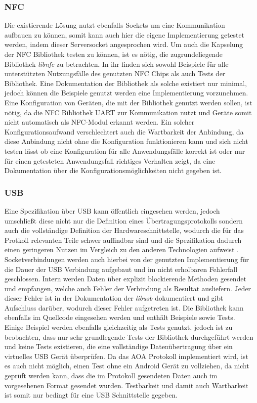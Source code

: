 		\subsubsection{NFC} Die existierende Lösung nutzt ebenfalls Sockets um eine Kommunikation aufbauen zu können, somit kann auch hier die eigene Implementierung getestet werden, indem dieser Serversocket angesprochen wird. Um auch die Kapselung der NFC Bibliothek testen zu können, ist es nötig, die zugrundeliegende Bibliothek {\it libnfc} zu betrachten. In ihr finden sich sowohl Beispiele für alle unterstützten Nutzungsfälle des genutzten NFC Chips als auch Tests der Bibliothek. Eine Dokumentation der Bibliothek als solche existiert nur minimal, jedoch können die Beispiele genutzt werden eine Implementierung vorzunehmen. Eine Konfiguration von Geräten, die mit der Bibliothek genutzt werden sollen, ist nötig, da die NFC Bibliothek UART zur Kommunikation nutzt und Geräte somit nicht automatisch als NFC-Modul erkannt werden. Ein solcher Konfigurationsaufwand verschlechtert auch die Wartbarkeit der Anbindung, da diese Anbindung nicht ohne die Konfiguration funktionieren kann und sich nicht testen lässt ob eine Konfiguration für alle Anwendungsfälle korrekt ist oder nur für einen getesteten Anwendungsfall richtiges Verhalten zeigt, da eine Dokumentation über die Konfigurationsmöglichkeiten nicht gegeben ist. 
		
          \subsubsection{USB} Eine Spezifikation über USB kann öffentlich eingesehen werden, jedoch umschließt diese nicht nur die Definition eines Übertragungsprotokolls sondern auch die \linebreak vollständige Definition der Hardwareschnittstelle, wodurch die für das Protkoll relevanten Teile schwer auffindbar sind und die Spezifikation dadurch einen geringeren Nutzen im Vergleich zu den anderen Technologien aufweist \cite{usbSpec}. Socketverbindungen werden auch hierbei von der genutzten Implementierung für die Dauer der USB Verbindung aufgebaut und im nicht erholbaren Fehlerfall geschlossen. Intern werden Daten über explizit blockierende Methoden gesendet und empfangen, welche auch Fehler der Verbindung als Resultat ausliefern. Jeder dieser Fehler ist in der Dokumentation der {\it libusb} dokumentiert und gibt Aufschluss darüber, wodurch dieser Fehler aufgetreten ist. Die Bibliothek kann ebenfalls im Quellcode eingesehen werden und enthält Beispiele sowie Tests.
     Einige Beispiel werden ebenfalls gleichzeitig als Tests genutzt, jedoch ist zu beobachten, dass nur sehr grundlegende Tests der Bibliothek durchgeführt werden und keine Tests existieren, die eine vollständige Datenübertragung über ein virtuelles USB Gerät überprüfen. Da das AOA Protokoll implementiert wird, ist es auch nicht möglich, einen Test ohne ein Android Gerät zu vollziehen, da nicht geprüft werden kann, dass die im Protokoll gesendeten Daten auch im vorgesehenen Format gesendet wurden. Testbarkeit und damit auch Wartbarkeit ist somit nur bedingt für eine USB Schnittstelle gegeben.
		
